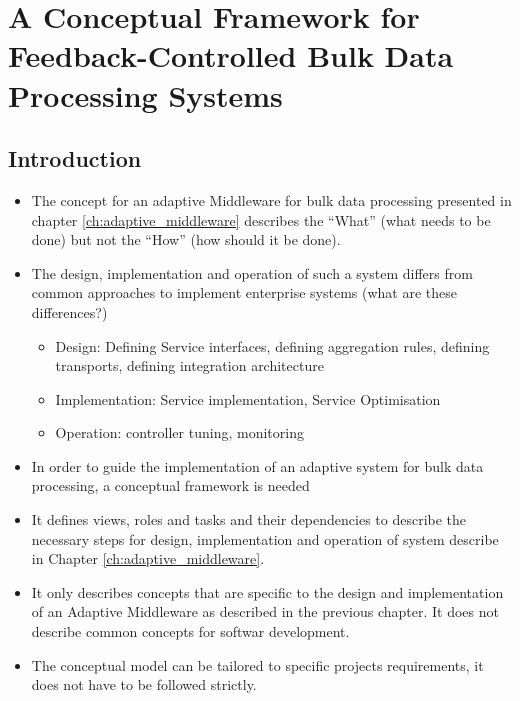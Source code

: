 

\chapter[Conceptual Framework]{A Conceptual Framework for Feedback-Controlled Bulk Data Processing Systems}\label{ch:conceptual_framework}


\section{Introduction} 

\begin{itemize}
	\item The concept for an adaptive Middleware for bulk data processing presented in chapter \ref{ch:adaptive_middleware} describes the ``What'' (what needs to be done) but not the ``How'' (how should it be done).
	\item The design, implementation and operation of such a system differs from common approaches to implement enterprise systems (what are these differences?)
	\begin{itemize}
		\item Design: Defining Service interfaces, defining aggregation rules, defining transports, defining integration architecture
		\item Implementation: Service implementation, Service Optimisation
		\item Operation: controller tuning, monitoring
	\end{itemize}
	\item In order to guide the implementation of an adaptive system for bulk data processing, a conceptual framework is needed
	\item It defines views, roles and tasks and their dependencies to describe the necessary steps for design, implementation and operation of system describe in Chapter \ref{ch:adaptive_middleware}.
	\item It only describes concepts that are specific to the design and implementation of an Adaptive Middleware as described in the previous chapter. It does not describe common concepts for softwar development.
	\item The conceptual model can be tailored to specific projects requirements, it does not have to be followed strictly.
\end{itemize}

